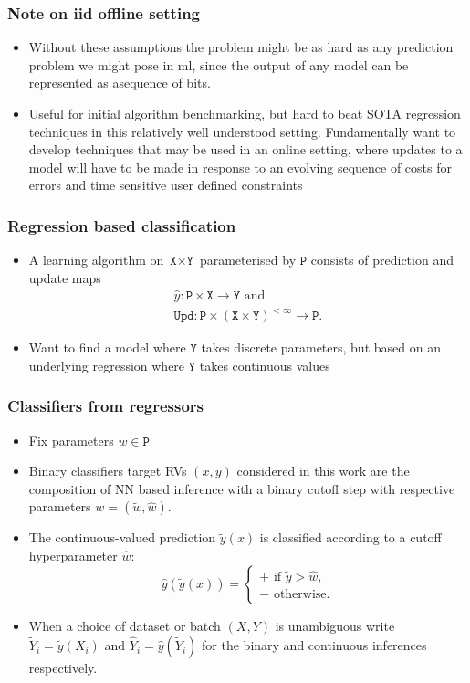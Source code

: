\documentclass{beamer}
\newcommand{\IN}{{\texttt{X}}}
\newcommand{\OUT}{{\texttt{Y}}}
\newcommand{\PAR}{{\texttt{P}}}
\newcommand{\CO}{{\hat w}}
\newcommand{\NNW}{{\tilde w}}
\newcommand{\PRED}{{\hat y}}%
\newcommand{\PREDSMOOTH}{{\tilde y}}%
\newcommand{\yP}{{\hat y}}
\newcommand{\YP}{{\hat Y}}
\newcommand{\YN}{{\tilde Y}}
\newcommand{\UPD}{{\texttt{Upd}}}
\begin{document}
\begin{frame}
\frametitle{Note on iid offline setting}
\begin{itemize}
  \item
    Without these assumptions the problem might be as hard as any prediction problem we might pose in ml, since the output of any model can be represented as asequence of bits.
  \item
    Useful for initial algorithm benchmarking, but hard to beat SOTA regression techniques in this relatively well understood setting.
    Fundamentally want to develop techniques that may be used in an online setting, where updates to a model will have to be made in response to an evolving sequence of costs for errors and time sensitive user defined constraints
\end{itemize}
\end{frame}
\begin{frame}
\frametitle{Regression based classification}
\begin{itemize}
\item
  A learning algorithm on $\IN\times\OUT$ parameterised by $\PAR$ consists of prediction and update maps
\begin{gather*}
  \PRED:\PAR\times\IN\rightarrow\OUT\text{ and}\\
  \UPD:\PAR\times\left(\IN\times\OUT\right)^{<\infty}\rightarrow\PAR.
\end{gather*}
\item
  Want to find a model where $\OUT$ takes discrete parameters, but based on an underlying regression where $\OUT$ takes continuous values
\end{itemize}
\end{frame}
\begin{frame}
\frametitle{Classifiers from regressors}
\begin{itemize}
\item
  Fix parameters $w\in\PAR$
\item
  Binary classifiers target RVs $(x,y)$ considered in this work are the composition of NN based inference with a binary cutoff step with respective parameters $w=(\NNW,\CO)$.
  \item
    The continuous-valued prediction $\PREDSMOOTH(x)$ is classified according to a cutoff hyperparameter $\CO$:
    $$
    \PRED(\PREDSMOOTH(x))=\begin{cases}+\text{ if }\tilde y>\CO,\\-\text{ otherwise.}\end{cases}
    $$
\item
  When a choice of dataset or batch $(X,Y)$ is unambiguous write $\YN_i=\PREDSMOOTH(X_i)$ and $\YP_i=\yP(\YN_i)$ for the binary and continuous inferences respectively.
\end{itemize}
\end{frame}
\end{document}
